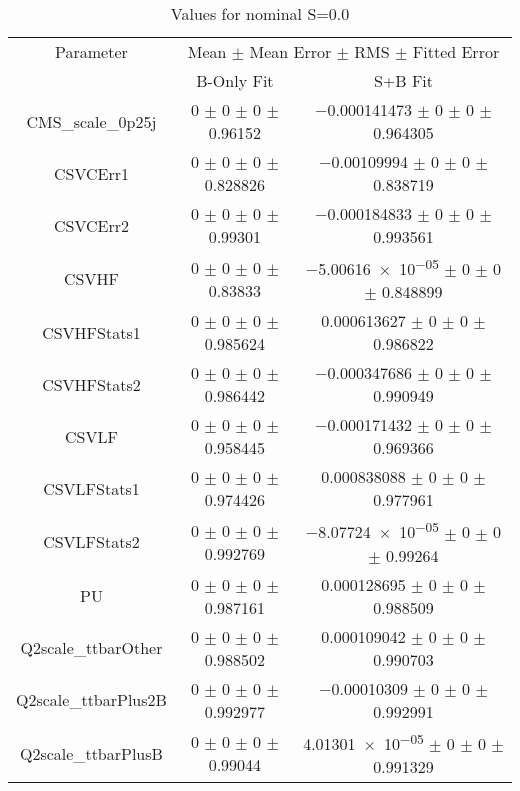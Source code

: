 \begin{table}
\centering
\caption{Values for nominal S=0.0}
\begin{tabular}{ccc}
\toprule
Parameter & \multicolumn{2}{c}{Mean $\pm$ Mean Error $\pm$ RMS $\pm$ Fitted Error}\\
 & B-Only Fit & S+B Fit\\
\midrule
CMS\_scale\_0p25j & \num{0} $\pm$ \num{0} $\pm$ \num{0} $\pm$ \num{0.96152} & \num{-0.000141473} $\pm$ \num{0} $\pm$ \num{0} $\pm$ \num{0.964305}\\
CSVCErr1 & \num{0} $\pm$ \num{0} $\pm$ \num{0} $\pm$ \num{0.828826} & \num{-0.00109994} $\pm$ \num{0} $\pm$ \num{0} $\pm$ \num{0.838719}\\
CSVCErr2 & \num{0} $\pm$ \num{0} $\pm$ \num{0} $\pm$ \num{0.99301} & \num{-0.000184833} $\pm$ \num{0} $\pm$ \num{0} $\pm$ \num{0.993561}\\
CSVHF & \num{0} $\pm$ \num{0} $\pm$ \num{0} $\pm$ \num{0.83833} & \num{-5.00616e-05} $\pm$ \num{0} $\pm$ \num{0} $\pm$ \num{0.848899}\\
CSVHFStats1 & \num{0} $\pm$ \num{0} $\pm$ \num{0} $\pm$ \num{0.985624} & \num{0.000613627} $\pm$ \num{0} $\pm$ \num{0} $\pm$ \num{0.986822}\\
CSVHFStats2 & \num{0} $\pm$ \num{0} $\pm$ \num{0} $\pm$ \num{0.986442} & \num{-0.000347686} $\pm$ \num{0} $\pm$ \num{0} $\pm$ \num{0.990949}\\
CSVLF & \num{0} $\pm$ \num{0} $\pm$ \num{0} $\pm$ \num{0.958445} & \num{-0.000171432} $\pm$ \num{0} $\pm$ \num{0} $\pm$ \num{0.969366}\\
CSVLFStats1 & \num{0} $\pm$ \num{0} $\pm$ \num{0} $\pm$ \num{0.974426} & \num{0.000838088} $\pm$ \num{0} $\pm$ \num{0} $\pm$ \num{0.977961}\\
CSVLFStats2 & \num{0} $\pm$ \num{0} $\pm$ \num{0} $\pm$ \num{0.992769} & \num{-8.07724e-05} $\pm$ \num{0} $\pm$ \num{0} $\pm$ \num{0.99264}\\
PU & \num{0} $\pm$ \num{0} $\pm$ \num{0} $\pm$ \num{0.987161} & \num{0.000128695} $\pm$ \num{0} $\pm$ \num{0} $\pm$ \num{0.988509}\\
Q2scale\_ttbarOther & \num{0} $\pm$ \num{0} $\pm$ \num{0} $\pm$ \num{0.988502} & \num{0.000109042} $\pm$ \num{0} $\pm$ \num{0} $\pm$ \num{0.990703}\\
Q2scale\_ttbarPlus2B & \num{0} $\pm$ \num{0} $\pm$ \num{0} $\pm$ \num{0.992977} & \num{-0.00010309} $\pm$ \num{0} $\pm$ \num{0} $\pm$ \num{0.992991}\\
Q2scale\_ttbarPlusB & \num{0} $\pm$ \num{0} $\pm$ \num{0} $\pm$ \num{0.99044} & \num{4.01301e-05} $\pm$ \num{0} $\pm$ \num{0} $\pm$ \num{0.991329}\\

\end{tabular}
\end{table}

